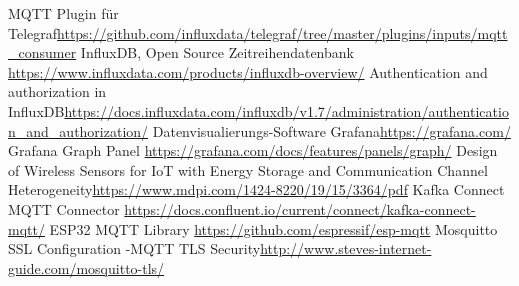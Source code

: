 \documentclass[
  12pt, %
  a4paper, %
  oneside, %
  openany, 
  numbers=noenddot, %
  BCOR=5mm, %
  parskip=half*, %
  thesis, %
]{bfhbook}
\begin{document}
\begin{thebibliography}{99}
    MQTT Plugin für Telegraf\break \url{https://github.com/influxdata/telegraf/tree/master/plugins/inputs/mqtt_consumer}
     InfluxDB, Open Source Zeitreihendatenbank \break \url{https://www.influxdata.com/products/influxdb-overview/}
    Authentication and authorization in InfluxDB\break \url{https://docs.influxdata.com/influxdb/v1.7/administration/authentication_and_authorization/}
     Datenvisualierungs-Software Grafana\break \url{https://grafana.com/}
    Grafana Graph Panel \break \url{https://grafana.com/docs/features/panels/graph/}
    Design of Wireless Sensors for IoT with Energy Storage and Communication Channel Heterogeneity\break \url{https://www.mdpi.com/1424-8220/19/15/3364/pdf}
    Kafka Connect MQTT Connector \break  \url{https://docs.confluent.io/current/connect/kafka-connect-mqtt/}
    ESP32 MQTT Library \break \url{https://github.com/espressif/esp-mqtt}
    Mosquitto SSL Configuration -MQTT TLS Security\break \url{http://www.steves-internet-guide.com/mosquitto-tls/}
  \end{thebibliography}
\endgroup
\end{document}
